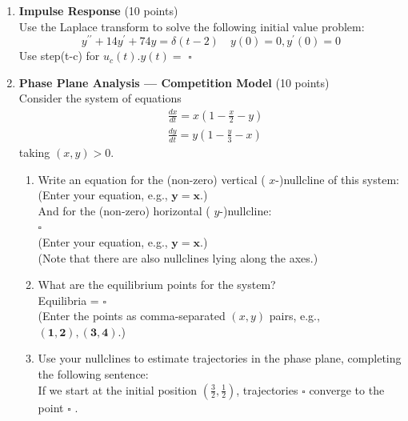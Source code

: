 \begin{enumerate}
  \item \textbf{Impulse Response} (10 points)\\
  Use the Laplace transform to solve the following initial value problem:
  $$
  y^{\prime \prime}+14 y^{\prime}+74 y=\delta(t-2) \quad y(0)=0, y^{\prime}(0)=0
  $$
  Use step(t-c) for $u_c(t) . y(t)=$ $\square$\\
  \begin{subanswer}
  \end{subanswer}

  \newpage

  \item \textbf{Phase Plane Analysis --- Competition Model} (10 points)\\
  Consider the system of equations
  $$
  \begin{aligned}
  & \frac{d x}{d t}=x\left(1-\frac{x}{2}-y\right) \\
  & \frac{d y}{d t}=y\left(1-\frac{y}{3}-x\right)
  \end{aligned}
  $$
  taking $(x, y)>0$.
  \begin{enumerate}[label=\alph*]
    \item Write an equation for the (non-zero) vertical ( $x$-)nullcline of this system:\\
    (Enter your equation, e.g., $\boldsymbol{y}=\boldsymbol{x}$.)\\
    And for the (non-zero) horizontal ( $y$-)nullcline:\\
    $\square$\\
    (Enter your equation, e.g., $\boldsymbol{y}=\boldsymbol{x}$.)\\
    (Note that there are also nullclines lying along the axes.)\\
    \begin{subanswer}
    \end{subanswer}
    \item What are the equilibrium points for the system?\\
    Equilibria = $\square$\\
    (Enter the points as comma-separated $(x, y)$ pairs, e.g., $(\mathbf{1 , 2}),(\mathbf{3 , 4})$.)\\
    \begin{subanswer}
    \end{subanswer}
    \item Use your nullclines to estimate trajectories in the phase plane, completing the following sentence:\\
    If we start at the initial position $\left(\frac{3}{2}, \frac{1}{2}\right)$, trajectories $\square$ converge to the point $\square$ .\\
    \begin{subanswer}
    \end{subanswer}
  \end{enumerate}


\end{enumerate}
